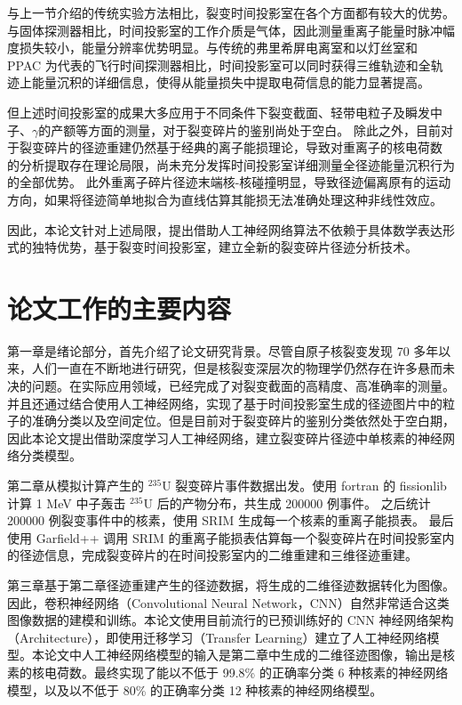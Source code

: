\documentclass[AutoFakeBold]{LZUThesis}
\begin{document}
与上一节介绍的传统实验方法相比，裂变时间投影室在各个方面都有较大的优势。与固体探测器相比，时间投影室的工作介质是气体，因此测量重离子能量时脉冲幅度损失较小，能量分辨率优势明显。与传统的弗里希屏电离室和以灯丝室和 PPAC 为代表的飞行时间探测器相比，时间投影室可以同时获得三维轨迹和全轨迹上能量沉积的详细信息，使得从能量损失中提取电荷信息的能力显著提高。

但上述时间投影室的成果大多应用于不同条件下裂变截面、轻带电粒子及瞬发中子、$\gamma$的产额等方面的测量，对于裂变碎片的鉴别尚处于空白。
除此之外，目前对于裂变碎片的径迹重建仍然基于经典的离子能损理论，导致对重离子的核电荷数 的分析提取存在理论局限，尚未充分发挥时间投影室详细测量全径迹能量沉积行为的全部优势\cite{魏康2019基于GEM工艺的裂变时间投影室中裂变碎片的讨论}。
此外重离子碎片径迹末端核-核碰撞明显，导致径迹偏离原有的运动方向，如果将径迹简单地拟合为直线估算其能损无法准确处理这种非线性效应。

因此，本论文针对上述局限，提出借助人工神经网络算法不依赖于具体数学表达形式的独特优势，基于裂变时间投影室，建立全新的裂变碎片径迹分析技术。




\section{论文工作的主要内容}
第一章是绪论部分，首先介绍了论文研究背景。尽管自原子核裂变发现 70 多年以来，人们一直在不断地进行研究，但是核裂变深层次的物理学仍然存在许多悬而未决的问题。在实际应用领域，已经完成了对裂变截面的高精度、高准确率的测量。并且还通过结合使用人工神经网络，实现了基于时间投影室生成的径迹图片中的粒子的准确分类以及空间定位。但是目前对于裂变碎片的鉴别分类依然处于空白期，因此本论文提出借助深度学习人工神经网络，建立裂变碎片径迹中单核素的神经网络分类模型。


第二章从模拟计算产生的 $^{235}$U 裂变碎片事件数据出发。使用 fortran 的 fissionlib 计算 1 MeV 中子轰击 $^{235}$U 后的产物分布，共生成 200000 例事件。
之后统计 200000 例裂变事件中的核素，使用 SRIM 生成每一个核素的重离子能损表。
最后使用 Garfield++ 调用 SRIM 的重离子能损表估算每一个裂变碎片在时间投影室内的径迹信息，完成裂变碎片的在时间投影室内的二维重建和三维径迹重建。

第三章基于第二章径迹重建产生的径迹数据，将生成的二维径迹数据转化为图像。因此，卷积神经网络（Convolutional Neural Network，CNN）自然非常适合这类图像数据的建模和训练。本论文使用目前流行的已预训练好的 CNN 神经网络架构（Architecture），即使用迁移学习（Transfer Learning）建立了人工神经网络模型。本论文中人工神经网络模型的输入是第二章中生成的二维径迹图像，输出是核素的核电荷数。最终实现了能以不低于 99.8\% 的正确率分类 6 种核素的神经网络模型，以及以不低于 80\% 的正确率分类 12 种核素的神经网络模型。
\end{document}
